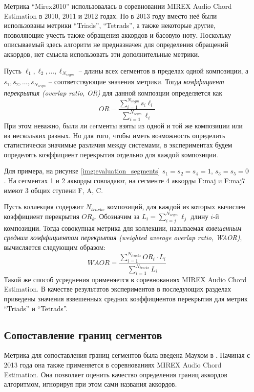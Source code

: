 Метрика ``Mirex2010'' использовалась в соревновании MIREX Audio Chord Estimation
в 2010, 2011 и 2012 годах. Но в 2013 году вместо неё были использованы метрики
``Triads'', ``Tetrads'', а также некоторые другие, позволяющие учесть также
обращения аккордов и басовую ноту. Поскольку описываемый здесь алгоритм не
предназначен для определения обращений аккордов, нет смысла использовать эти
дополнительные метрики.

Пусть $\ell_1, \ell_2, \ldots, \ell_{N_{segm}}$ -- длины всех сегментов в
пределах одной композиции, а $s_1, s_2, \ldots, s_{N_{segm}}$ -- соответствующие
значения метрики. Тогда \emph{коэффициент перекрытия (overlap ratio, OR)} для
данной композции определяется как
\begin{equation} \label{eq:or}
OR = \frac{\sum_{i=1}^{N_{segm}} s_i \ell_i}{\sum_{i=1}^{N_{segm}} \ell_i}
\end{equation}
При этом неважно, были ли ceгменты взяты из одной и той же композиции или из
нескольких разных. Но для того, чтобы иметь возможность определить
статистически значимые различия между системами, в экспериментах будем
определять коэффициент перекрытия отдельно для каждой композиции.

Для примера, на рисунке \ref{img:evaluation_segments} $s_1 = s_2 = s_4 = 1$,
$s_3 = s_5 = 0$. На сегментах 1 и 2 аккорды совпадают, на сегменте 4 аккорды
F:maj и F:maj7 имеют 3 общих ступени F, A, C.

Пусть коллекция содержит $N_{tracks}$ композиций, для каждой из которых
вычислен коэффициент перекрытия $OR_k$. Обозначим за $L_i =
\sum_{i=j}^{N_{segm}} \ell_j$ длину $i$-й композиции. Тогда совокупная метрика
для коллекции, называемая \emph{взвешенным средним коэффициентом перекрытия
(weighted average overlap ratio, WAOR)}, вычисляется следующим образом:
\begin{equation} \label{eq:waor}
WAOR = \frac{\sum_{i=1}^{N_{tracks}} OR_i \cdot L_i}{\sum_{i=1}^{N_{tracks}}
L_i}
\end{equation}
Такой же способ усреднения применяется в соревнованиях MIREX Audio Chord
Estimation. В качестве результатов экспериментов в последующих разделах
приведены значения взвешенных средних коэффициентов перекрытия для метрик
``Triads'' и ``Tetrads''.

\subsection{Сопоставление границ сегментов}

Метрика для сопоставления границ сегментов была введена Маухом в
\cite{MauchThesis2010}. Начиная с 2013 года она также применяется в
соревнованиях MIREX Audio Chord Estimation. Она позволяет оценить качество
определения границ аккордов алгоритмом, игнорируя при этом сами названия
аккордов.

